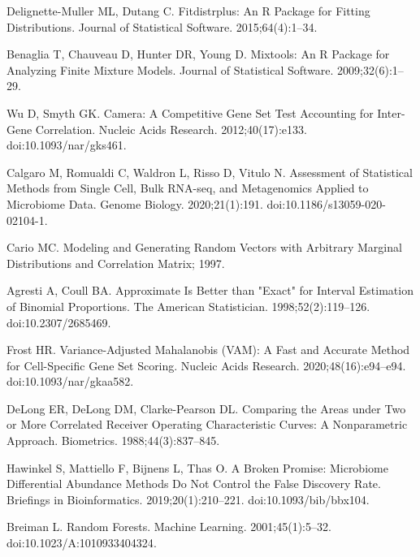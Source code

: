 \documentclass{article}
\begin{document}
\clearpage
\begin{thebibliography}{10}

{Delignette-Muller} ML, Dutang C.
\newblock Fitdistrplus: {{An R}} Package for Fitting Distributions.
\newblock Journal of Statistical Software. 2015;64(4):1--34.

Benaglia T, Chauveau D, Hunter DR, Young D.
\newblock Mixtools: {{An R}} Package for Analyzing Finite Mixture Models.
\newblock Journal of Statistical Software. 2009;32(6):1--29.

Wu D, Smyth GK.
\newblock Camera: A Competitive Gene Set Test Accounting for Inter-Gene
  Correlation.
\newblock Nucleic Acids Research. 2012;40(17):e133.
\newblock doi:{10.1093/nar/gks461}.

Calgaro M, Romualdi C, Waldron L, Risso D, Vitulo N.
\newblock Assessment of Statistical Methods from Single Cell, Bulk {{RNA-seq}},
  and Metagenomics Applied to Microbiome Data.
\newblock Genome Biology. 2020;21(1):191.
\newblock doi:{10.1186/s13059-020-02104-1}.

Cario MC.
\newblock Modeling and {{Generating Random Vectors}} with {{Arbitrary Marginal
  Distributions}} and {{Correlation Matrix}}; 1997.

Agresti A, Coull BA.
\newblock Approximate {{Is Better}} than "{{Exact}}" for {{Interval
  Estimation}} of {{Binomial Proportions}}.
\newblock The American Statistician. 1998;52(2):119--126.
\newblock doi:{10.2307/2685469}.

Frost HR.
\newblock Variance-Adjusted {{Mahalanobis}} ({{VAM}}): A Fast and Accurate
  Method for Cell-Specific Gene Set Scoring.
\newblock Nucleic Acids Research. 2020;48(16):e94--e94.
\newblock doi:{10.1093/nar/gkaa582}.

DeLong ER, DeLong DM, {Clarke-Pearson} DL.
\newblock Comparing the Areas under Two or More Correlated Receiver Operating
  Characteristic Curves: A Nonparametric Approach.
\newblock Biometrics. 1988;44(3):837--845.

Hawinkel S, Mattiello F, Bijnens L, Thas O.
\newblock A Broken Promise: Microbiome Differential Abundance Methods Do Not
  Control the False Discovery Rate.
\newblock Briefings in Bioinformatics. 2019;20(1):210--221.
\newblock doi:{10.1093/bib/bbx104}.

Breiman L.
\newblock Random {{Forests}}.
\newblock Machine Learning. 2001;45(1):5--32.
\newblock doi:{10.1023/A:1010933404324}.


\end{thebibliography}
\end{document}
